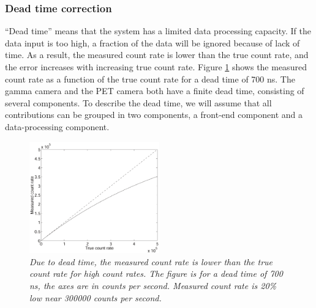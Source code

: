 \documentclass[11pt,oneside]{article}
\begin{document}
\subsubsection{Dead time correction} \label{sec:deadtime}
``Dead time'' means that the system has a limited data processing capacity. If
the data input is too high, a fraction of the data will be ignored because of
lack of time. As a result, the measured count rate is lower than the true
count rate, and the error increases with increasing true count rate. Figure
\ref{fig:dead_time} shows the measured count rate as a function of the true
count rate for a dead time of 700 ns. The gamma camera and the PET camera both
have a finite dead time, consisting of several components. To describe the
dead time, we will assume that all contributions can be grouped in two
components, a front-end component and a data-processing component.

\begin{figure}[tb]
\centering
\includegraphics[width=0.5\textwidth]{figs/fig_dead_time.pdf}
\caption{\label{fig:dead_time} \emph{Due to dead time, the measured count rate
is lower than the true count rate for high count rates. The figure is for a
dead time of 700 ns, the axes are in counts per second. Measured count rate is
20\% low near 300000 counts per second.}}
\end{figure}
\end{document}
